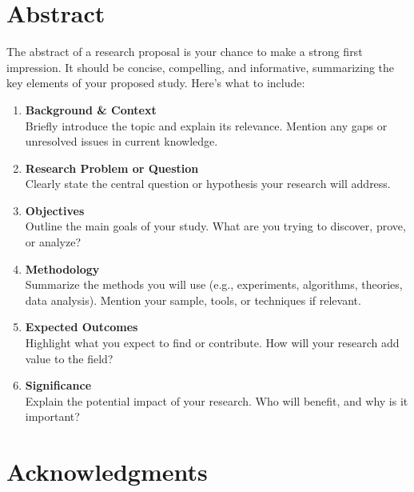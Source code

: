 \documentclass[PCOM,Proposal,Review]{mpThesis}
\newcommand{\Hd}[1]{{\color{SteelBlue}\bf#1}}
\begin{document}
\begin{FrontMatter}[FigLs=true,TabLs=true,AlgoLs=false,AbbreLs=true]


\chapter{Abstract}

\begin{Remark}
The abstract of a research proposal is your chance to make a strong first impression.
It should be concise, compelling, and informative, summarizing the key elements of your proposed study.
Here's what to include:
\begin{enumerate}
\item \Hd{Background \& Context} \\
Briefly introduce the topic and explain its relevance. Mention any gaps or unresolved issues in current knowledge.

\item \Hd{Research Problem or Question} \\
Clearly state the central question or hypothesis your research will address.

\item \Hd{Objectives} \\
Outline the main goals of your study. What are you trying to discover, prove, or analyze?

\item \Hd{Methodology} \\
Summarize the methods you will use (e.g., experiments, algorithms, theories, data analysis). Mention your sample, tools, or techniques if relevant.

\item \Hd{Expected Outcomes} \\
Highlight what you expect to find or contribute. How will your research add value to the field?

\item \Hd{Significance} \\
Explain the potential impact of your research. Who will benefit, and why is it important?
\end{enumerate}
\end{Remark}
\Keywords{\InsertThesisKeywords}

\chapter{Acknowledgments}


\end{FrontMatter}
\end{document}
